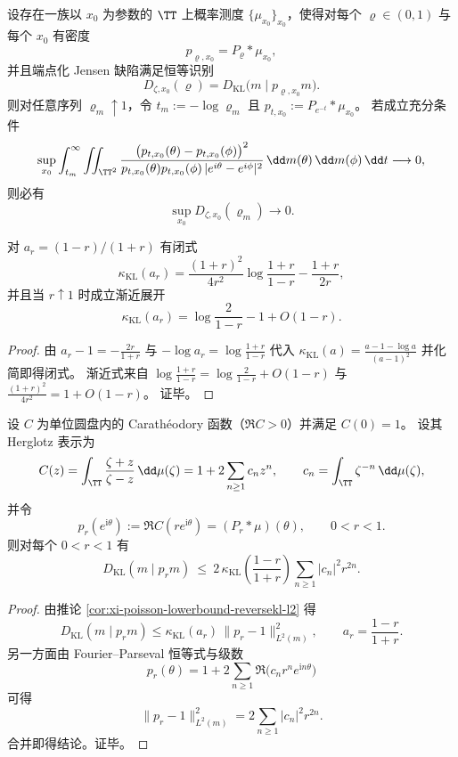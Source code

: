 \begin{conjecture}\label{conj:xi-endpoint-jensen-defect-poisson-dissipation-bridge}
设存在一族以 \(x_0\) 为参数的 \(\TT\) 上概率测度 \(\{\mu_{x_0}\}_{x_0}\)，使得对每个 \(\varrho\in(0,1)\) 与每个 \(x_0\) 有密度
\[
p_{\varrho,x_0}=P_{\varrho}*\mu_{x_0},
\]
并且端点化 Jensen 缺陷满足恒等识别
\[
D_{\zeta,x_0}(\varrho)=D_{\mathrm{KL}}\!\bigl(m\mid p_{\varrho,x_0}m\bigr).
\]
则对任意序列 \(\varrho_m\uparrow 1\)，令 \(t_m:=-\log\varrho_m\) 且 \(p_{t,x_0}:=P_{e^{-t}}*\mu_{x_0}\)。
若成立充分条件
\[
\sup_{x_0}\int_{t_m}^{\infty}\iint_{\TT^2}
\frac{\bigl(p_{t,x_0}(\theta)-p_{t,x_0}(\phi)\bigr)^2}
{p_{t,x_0}(\theta)p_{t,x_0}(\phi)\,|e^{i\theta}-e^{i\phi}|^2}\,\dd m(\theta)\,\dd m(\phi)\,\dd t
\longrightarrow 0,
\]
则必有
\[
\sup_{x_0}D_{\zeta,x_0}(\varrho_m)\longrightarrow 0.
\]
\end{conjecture}

\begin{proposition}[常数的闭式化与端点渐近]\label{prop:xi-kappaKL-ar-closed-asymptotic}
对 \(a_r=(1-r)/(1+r)\) 有闭式
\[
\kappa_{\mathrm{KL}}(a_r)
=\frac{(1+r)^2}{4r^2}\log\frac{1+r}{1-r}-\frac{1+r}{2r},
\]
并且当 \(r\uparrow 1\) 时成立渐近展开
\[
\kappa_{\mathrm{KL}}(a_r)=\log\frac{2}{1-r}-1+O(1-r).
\]
\end{proposition}
\begin{proof}
由 \(a_r-1=-\frac{2r}{1+r}\) 与 \(-\log a_r=\log\frac{1+r}{1-r}\) 代入
\(
\kappa_{\mathrm{KL}}(a)=\frac{a-1-\log a}{(a-1)^2}
\)
并化简即得闭式。
渐近式来自
\(
\log\frac{1+r}{1-r}=\log\frac{2}{1-r}+O(1-r)
\)
与
\(
\frac{(1+r)^2}{4r^2}=1+O(1-r)
\)。
证毕。
\end{proof}

\begin{theorem}\label{thm:xi-caratheodory-poisson-fiber-reversekl-energy}
设 \(C\) 为单位圆盘内的 Carath\'eodory 函数（\(\Re C>0\)）并满足 \(C(0)=1\)。
设其 Herglotz 表示为
\[
C(z)=\int_{\TT}\frac{\zeta+z}{\zeta-z}\,\dd\mu(\zeta)
=1+2\sum_{n\ge 1}c_n z^n,
\qquad
c_n=\int_{\TT}\zeta^{-n}\,\dd\mu(\zeta),
\]
并令
\[
p_r(e^{\mathrm i\theta}):=\Re C(re^{\mathrm i\theta})=(P_r*\mu)(\theta),\qquad 0<r<1.
\]
则对每个 \(0<r<1\) 有
\[
D_{\mathrm{KL}}(m\mid p_r m)
\ \le\
2\,\kappa_{\mathrm{KL}}\!\left(\frac{1-r}{1+r}\right)
\sum_{n\ge 1}|c_n|^2r^{2n}.
\]
\end{theorem}
\begin{proof}
由推论 \ref{cor:xi-poisson-lowerbound-reversekl-l2} 得
\[
D_{\mathrm{KL}}(m\mid p_r m)\le \kappa_{\mathrm{KL}}(a_r)\,\|p_r-1\|_{L^2(m)}^2,\qquad a_r=\frac{1-r}{1+r}.
\]
另一方面由 Fourier--Parseval 恒等式与级数
\[
p_r(\theta)=1+2\sum_{n\ge 1}\Re\bigl(c_n r^n e^{\mathrm i n\theta}\bigr)
\]
可得
\[
\|p_r-1\|_{L^2(m)}^2
=2\sum_{n\ge 1}|c_n|^2r^{2n}.
\]
合并即得结论。证毕。
\end{proof}

